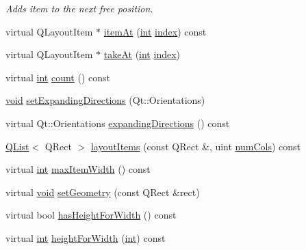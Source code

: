 \begin{DoxyCompactItemize}
\begin{DoxyCompactList}\small\item\em Adds item to the next free position. \end{DoxyCompactList}\item 
virtual Q\-Layout\-Item $\ast$ \hyperlink{class_qwt_dyn_grid_layout_adbec8dc847c4159d0765c8f0dd80d148}{item\-At} (\hyperlink{ioapi_8h_a787fa3cf048117ba7123753c1e74fcd6}{int} \hyperlink{glext_8h_ab47dd9958bcadea08866b42bf358e95e}{index}) const 
\item 
virtual Q\-Layout\-Item $\ast$ \hyperlink{class_qwt_dyn_grid_layout_ad16c097bc1563eb1587e12789498bac9}{take\-At} (\hyperlink{ioapi_8h_a787fa3cf048117ba7123753c1e74fcd6}{int} \hyperlink{glext_8h_ab47dd9958bcadea08866b42bf358e95e}{index})
\item 
virtual \hyperlink{ioapi_8h_a787fa3cf048117ba7123753c1e74fcd6}{int} \hyperlink{class_qwt_dyn_grid_layout_a9a74593721ef1eba3d70275c36500ff6}{count} () const 
\item 
\hyperlink{group___u_a_v_objects_plugin_ga444cf2ff3f0ecbe028adce838d373f5c}{void} \hyperlink{class_qwt_dyn_grid_layout_a56cd48dda979428402dd39d470674dee}{set\-Expanding\-Directions} (Qt\-::\-Orientations)
\item 
virtual Qt\-::\-Orientations \hyperlink{class_qwt_dyn_grid_layout_a1340bdbdaf09f79ac9e80f96f1b8b106}{expanding\-Directions} () const 
\item 
\hyperlink{class_q_list}{Q\-List}$<$ Q\-Rect $>$ \hyperlink{class_qwt_dyn_grid_layout_a0fe5c2a70d1086036fac2487cc982341}{layout\-Items} (const Q\-Rect \&, uint \hyperlink{class_qwt_dyn_grid_layout_a4678cd0f67c332162c266ac9661b5db6}{num\-Cols}) const 
\item 
virtual \hyperlink{ioapi_8h_a787fa3cf048117ba7123753c1e74fcd6}{int} \hyperlink{class_qwt_dyn_grid_layout_a74ebb14c4b4fae32354d3824bf29c93e}{max\-Item\-Width} () const 
\item 
virtual \hyperlink{group___u_a_v_objects_plugin_ga444cf2ff3f0ecbe028adce838d373f5c}{void} \hyperlink{class_qwt_dyn_grid_layout_afdf23bb94de5258f14fb077b39a64391}{set\-Geometry} (const Q\-Rect \&rect)
\item 
virtual bool \hyperlink{class_qwt_dyn_grid_layout_ae8867d543d54d5da9657c55b3c329d8e}{has\-Height\-For\-Width} () const 
\item 
virtual \hyperlink{ioapi_8h_a787fa3cf048117ba7123753c1e74fcd6}{int} \hyperlink{class_qwt_dyn_grid_layout_afa3fd53b485e9f1ed90796ff923466f1}{height\-For\-Width} (\hyperlink{ioapi_8h_a787fa3cf048117ba7123753c1e74fcd6}{int}) const 

\end{DoxyCompactItemize}
